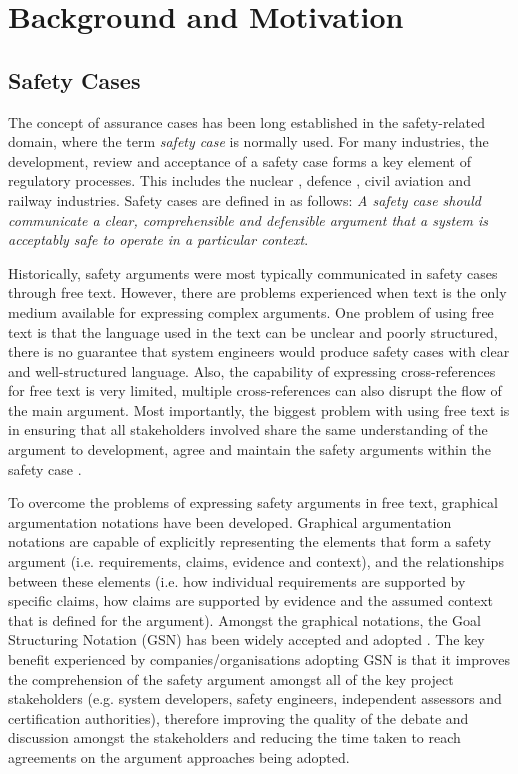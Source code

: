 \section{Background and Motivation}
\label{sec:background}

\subsection{Safety Cases}
The concept of assurance cases has been long established in the safety-related domain, where the term \textit{safety case} is normally used. 
For many industries, the development, review and acceptance of a safety case forms a key element of regulatory processes. This includes the nuclear \cite{hse}, defence \cite{mod2007}, civil aviation \cite{caa2007} and railway \cite{yellowBook2007} industries. Safety cases are defined in \cite{kelly2004goal} as follows: \textit{A safety case should communicate a clear, comprehensible and defensible argument that a system is acceptably safe to operate in a particular context}. 

Historically, safety arguments were most typically communicated in safety cases through free text. However, there are problems experienced when text is the only medium available for expressing complex arguments. One problem of using free text is that the language used in the text can be unclear and poorly structured, there is no guarantee that system engineers would produce safety cases with clear and well-structured language. Also, the capability of expressing cross-references for free text is very limited, multiple cross-references can also disrupt the flow of the main argument. Most importantly, the biggest problem with using free text is in ensuring that all stakeholders involved share the same understanding of the argument to development, agree and maintain the safety arguments within the safety case \cite{kelly2004goal}.

To overcome the problems of expressing safety arguments in free text, graphical argumentation notations have been developed. Graphical argumentation notations are capable of explicitly representing the elements that form a safety argument (i.e. requirements, claims, evidence and context), and the relationships between these elements (i.e. how individual requirements are supported by specific claims, how claims are supported by evidence and the assumed context that is defined for the argument). 
Amongst the graphical notations, the Goal Structuring Notation (GSN) \cite{kelly2004goal} has been widely accepted and adopted \cite{chinneck2004turning}. 
The key benefit experienced by companies/organisations adopting GSN is that it improves the comprehension of the safety argument amongst all of the key project stakeholders (e.g. system developers, safety engineers, independent assessors and certification authorities), therefore improving the quality of the debate and discussion amongst the stakeholders and reducing the time taken to reach agreements on the argument approaches being adopted.

